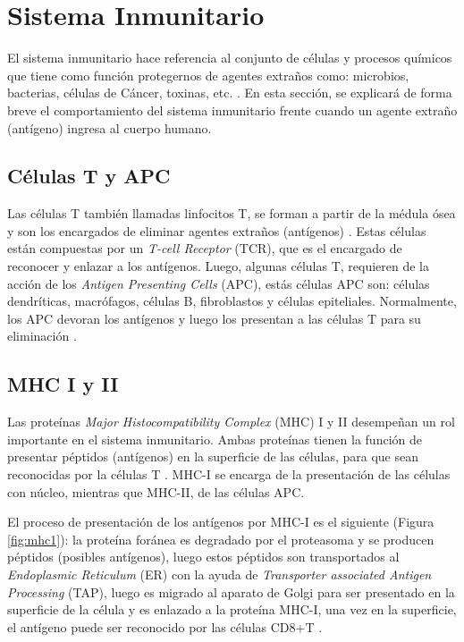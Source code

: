 \section{Sistema Inmunitario}

El sistema inmunitario hace referencia al conjunto de células y procesos químicos que tiene como función protegernos de agentes extraños como: microbios, bacterias, células de Cáncer, toxinas, etc. \cite{marshall2018introduction}. En esta sección, se explicará de forma breve el comportamiento del sistema inmunitario frente cuando un agente extraño (antígeno) ingresa al cuerpo humano.

\subsection{Células T y APC}

Las células T también llamadas linfocitos T, se forman a partir de la médula ósea y son los encargados de eliminar agentes extraños (antígenos) \cite{NCIdictionary2022}. Estas células están compuestas por un \textit{T-cell Receptor} (TCR), que es el encargado de reconocer y enlazar a los antígenos. Luego, algunas células T, requieren de la acción de los \textit{Antigen Presenting Cells} (APC), estás células APC son: células dendríticas, macrófagos, células B, fibroblastos y células epiteliales. Normalmente, los APC devoran los antígenos y luego los presentan a las células T para su eliminación  \citep{marshall2018introduction}.


\subsection{MHC I y II}

Las proteínas \textit{Major Histocompatibility Complex} (MHC) I y II desempeñan un rol importante en el sistema inmunitario. Ambas proteínas tienen la función de presentar péptidos (antígenos) en la superficie de las células, para que sean reconocidas por la células T \citep{abualrous2021major}. MHC-I se encarga de la presentación de las células con núcleo, mientras que MHC-II, de las células APC. 

El proceso de presentación de los antígenos por MHC-I es el siguiente (Figura \ref{fig:mhc1}): la proteína foránea es degradado por el proteasoma y se producen péptidos (posibles antígenos), luego estos péptidos son transportados al \textit{Endoplasmic Reticulum} (ER) con la ayuda de \textit{Transporter associated Antigen Processing} (TAP), luego es migrado al aparato de Golgi para ser presentado en la superficie de la célula y es enlazado a la proteína MHC-I, una vez en la superficie, el antígeno puede ser reconocido por las células CD8+T \citep{zhang2019application}.




